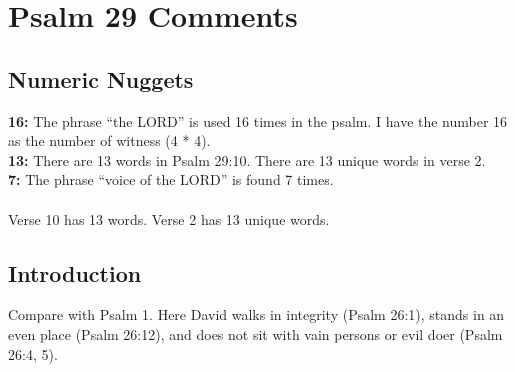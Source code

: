 \section{Psalm 29 Comments}

\subsection{Numeric Nuggets}
\textbf{16: } The phrase ``the LORD'' is used 16 times in the psalm.  I have the number 16 as the number of witness (4 * 4).\\
\noindent \textbf{13:} There are 13 words in Psalm 29:10. There are 13 unique words in verse 2. \\
\noindent \textbf{7: } The phrase ``voice of the LORD'' is found 7 times.\\
\\
\noindent Verse 10 has 13 words. Verse 2 has 13 unique words.

\subsection{Introduction}
Compare with Psalm 1. Here David walks in integrity (Psalm 26:1), stands in an even place (Psalm 26:12), and does not sit with vain persons or evil doer (Psalm 26:4, 5).
